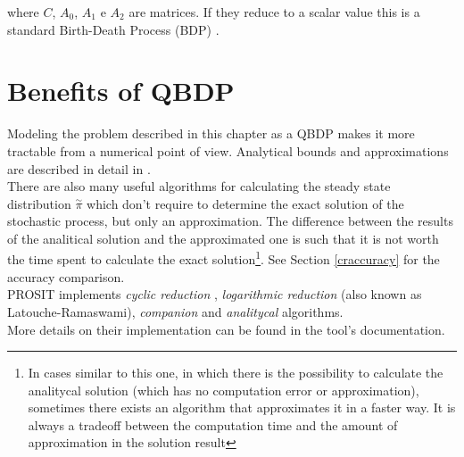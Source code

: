 where \( C \), \( A_{0} \), \( A_{1} \) e \( A_{2} \) are matrices. If they reduce to a scalar value this is a standard Birth-Death Process (BDP) \cite{probGuarantees}.

\section{Benefits of QBDP} \label{benefits}
Modeling the problem described in this chapter as a QBDP makes it more tractable from a numerical point of view. Analytical bounds and approximations are described in detail in \cite{probGuarantees}.\\
There are also many useful algorithms for calculating the steady state distribution \( \overset{\sim}{\pi} \) which don't require to determine the exact solution of the stochastic process, but only an approximation. The difference between the results of the analitical solution and the approximated one is such that it is not worth the time spent to calculate the exact solution\footnote{In cases similar to this one, in which there is the possibility to calculate the analitycal solution (which has no computation error or approximation), sometimes there exists an algorithm that approximates it in a faster way. It is always a tradeoff between the computation time and the amount of approximation in the solution result}. See Section \ref{craccuracy} for the accuracy comparison.\\
PROSIT implements \emph{cyclic reduction} \cite{cyclic}, \emph{logarithmic reduction} \cite{latouche} (also known as Latouche-Ramaswami), \emph{companion} \cite{probGuarantees} and \emph{analitycal} \cite{probGuarantees} algorithms.\\
More details on their implementation can be found in the tool's documentation.